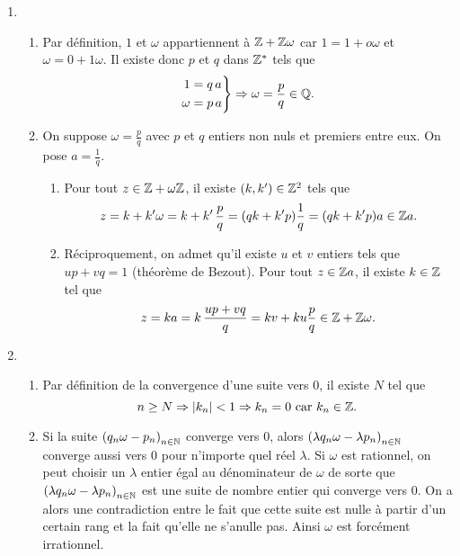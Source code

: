 \begin{enumerate}
 \item
  \begin{enumerate}
    \item Par définition, $1$ et $\omega$ appartiennent à $\mathbb{Z} + \mathbb{Z} \omega$ car $1 = 1 + o \omega$ et $\omega = 0 + 1 \omega$. Il existe donc $p$ et $q$ dans $\mathbb{Z}^*$ tels que 
\[
 \left. 
 \begin{aligned}
  1 &= q\,a \\ \omega &= p\, a
 \end{aligned}
\right\rbrace \Rightarrow \omega = \frac{p}{q} \in \mathbb{Q}.
\]

    \item On suppose $\omega = \frac{p}{q}$ avec $p$ et $q$ entiers non nuls et premiers entre eux. On pose $a= \frac{1}{q}$.
\begin{enumerate}
 \item Pour tout $z\in \mathbb{Z} + \omega \mathbb{Z}$, il existe $(k,k')\in \mathbb{Z}^2$ tels que 
\[
 z = k + k' \omega = k + k'\,\frac{p}{q} = (qk + k'p)\frac{1}{q} = (qk + k'p)a \in \mathbb{Z} a.
\]
 \item Réciproquement, on admet qu'il existe $u$ et $v$ entiers tels que $up + vq = 1$ (théorème de Bezout). Pour tout $z \in \mathbb{Z} a$, il existe $k \in \mathbb{Z}$ tel que 
\[
 z = ka = k\,\frac{up + vq}{q} = kv + ku \frac{p}{q} \in \mathbb{Z} + \mathbb{Z} \omega.
\]

\end{enumerate}

  \end{enumerate}

 \item
  \begin{enumerate}
    \item Par définition de la convergence d'une suite vers $0$, il existe $N$ tel que 
\[
 n \geq N \Rightarrow |k_n| < 1 \Rightarrow k_n = 0 \text{ car } k_n \in \mathbb{Z}.
\]
    \item Si la suite $\left( q_n\omega - p_n \right)_{n \in \mathbb{N}}$ converge vers $0$, alors $\left( \lambda q_n\omega - \lambda p_n \right)_{n \in \mathbb{N}}$ converge aussi vers $0$ pour n'importe quel réel $\lambda$.\newline
    Si $\omega$ est rationnel, on peut choisir un $\lambda$ entier égal au dénominateur de $\omega$ de sorte que $\left( \lambda q_n\omega - \lambda p_n \right)_{n \in \mathbb{N}}$ est une suite de nombre entier qui converge vers $0$. On a alors une contradiction entre le fait que cette suite est nulle à partir d'un certain rang et la fait qu'elle ne s'anulle pas. Ainsi $\omega$ est forcément irrationnel.
  \end{enumerate}

\end{enumerate}


